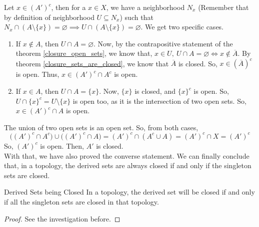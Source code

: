 \begin{Investigation}
    Let $x\in(A')^c$, then for a $x\in X$, we have a neighborhood $N_x$ (Remember that by definition of neighborhood $U\subseteq N_x$) such that $N_x\cap(A\setminus\{x\})=\varnothing\implies U\cap(A\setminus\{x\})=\varnothing$. We get two specific cases.
    \begin{enumerate}
        \item If $x\notin A$, then $U\cap A=\varnothing$. Now, by the contrapositive statement of the theorem \eqref{closure_open_sets}, we know that, $x\in U,\ U\cap A=\varnothing\iff x\notin\overline{A}$. By theorem \eqref{closure_sets_are_closed}, we know that $\overline{A}$ is closed. So, $x\in(\overline{A})^c$ is open. Thus, $x\in(A')^c\cap A^c$ is open.
        \item If $x\in A$, then $U\cap A=\{x\}$. Now, $\{x\}$ is closed, and $\{x\}^c$ is open. So, $U\cap\{x\}^c=U\setminus\{x\}$ is open too, as it is the intersection of two open sets. So, $x\in(A')^c\cap A$ is open.
    \end{enumerate}
    The union of two open sets is an open set. So, from both cases, $$\big((A')^c\cap A^c\big)\cup\big((A')^c\cap A\big)=(A')^c\cap(A^c\cup A)=(A')^c\cap X=(A')^c$$
    So, $(A')^c$ is open. Then, $A'$ is closed.\\
    With that, we have also proved the converse statement. We can finally conclude that, in a topology, the derived sets are always closed if and only if the singleton sets are closed.
\end{Investigation}
\begin{Theorem}{Derived Sets being Closed}\label{derived_set_being_closed}
    In a topology, the derived set will be closed if and only if all the singleton sets are closed in that topology.
\end{Theorem}
\begin{proof}
    See the investigation before.
\end{proof}
\exercise
